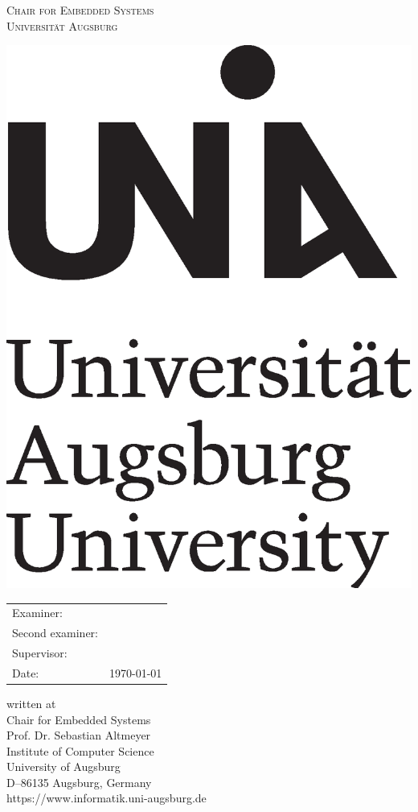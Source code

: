 \begin{titlepage}
	\centering
	{\scshape\LARGE Chair for  Embedded Systems \\ Universität Augsburg \par}
	\vspace{1cm}
	\includegraphics[scale=.25]{abbildungen/uni_logo.eps}\par
	\vspace{.5cm}
	{\Large \artDerAbschlussarbeit\par}
	\vspace{1.5cm}
	{\huge\bfseries \@title\par}
	\vspace{2cm}
	{\Large\itshape \@author\par}
	\vfill
	\begin{tabular}{ll}
		Examiner: &\gutachter\\
		Second examiner:& \zweitgutachter\\
		Supervisor:& \betreuer\\
		Date:& \today\\
	\end{tabular}
\end{titlepage}

\vspace*{\fill}
written at\\
Chair for Embedded Systems\\
Prof. Dr. Sebastian Altmeyer\\
Institute of Computer Science\\
University of Augsburg\\
D–86135 Augsburg, Germany\\
https://www.informatik.uni-augsburg.de